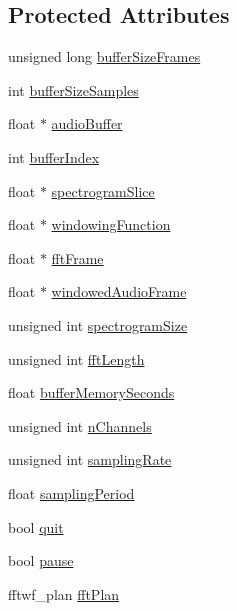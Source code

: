 \subsection*{Protected Attributes}
\begin{DoxyCompactItemize}
\item 
unsigned long \mbox{\hyperlink{classAudioInput_adb734d274b7ce2967b74e2280ff6d487}{buffer\+Size\+Frames}}
\item 
int \mbox{\hyperlink{classAudioInput_a4e213a9a22a62dccc3a54369101559c7}{buffer\+Size\+Samples}}
\item 
float $\ast$ \mbox{\hyperlink{classAudioInput_a797943485896a381ea80947c8b6a8488}{audio\+Buffer}}
\item 
int \mbox{\hyperlink{classAudioInput_a3c9888a90ca8bc6b42257f3f11ee9a6e}{buffer\+Index}}
\item 
float $\ast$ \mbox{\hyperlink{classAudioInput_aa277accc3be5054fe8439ac7086deaf5}{spectrogram\+Slice}}
\item 
float $\ast$ \mbox{\hyperlink{classAudioInput_a72417120c208d81359f5b1205fc06664}{windowing\+Function}}
\item 
float $\ast$ \mbox{\hyperlink{classAudioInput_a0c0e5c44a1547a97564e0733aaac2dc0}{fft\+Frame}}
\item 
float $\ast$ \mbox{\hyperlink{classAudioInput_ae5a196a9ba111b7aa1ef64db6f092432}{windowed\+Audio\+Frame}}
\item 
unsigned int \mbox{\hyperlink{classAudioInput_a1d4982a84d2e2e3d8a6b0f0fcdd4820e}{spectrogram\+Size}}
\item 
unsigned int \mbox{\hyperlink{classAudioInput_a5b31598e9106da62d86d11d69a9dbd20}{fft\+Length}}
\item 
float \mbox{\hyperlink{classAudioInput_aea3145ccca0f7cebf36a78278ca44031}{buffer\+Memory\+Seconds}}
\item 
unsigned int \mbox{\hyperlink{classAudioInput_a364801e7fa59b6c8ed881262b2085d42}{n\+Channels}}
\item 
unsigned int \mbox{\hyperlink{classAudioInput_acfe371c4f5790bd67d282bc83225728e}{sampling\+Rate}}
\item 
float \mbox{\hyperlink{classAudioInput_a8b6ea4cd6b88e5cd9d051b298efbb65e}{sampling\+Period}}
\item 
bool \mbox{\hyperlink{classAudioInput_aceef1c12e4f78624ed695371adf495df}{quit}}
\item 
bool \mbox{\hyperlink{classAudioInput_a3ff41f73529f77872f6ab585d7cf706a}{pause}}
\item 
fftwf\+\_\+plan \mbox{\hyperlink{classAudioInput_a9797094e75625173beae7e89497248b2}{fft\+Plan}}
\end{DoxyCompactItemize}


